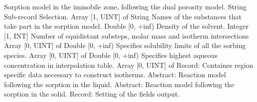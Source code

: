\begin{RecordType}
	{}
	{} %
	{} %
	{} %
	{{{Sorption model in the immobile zone, following the dual porosity model.}}}
		\KeyItem
			{}
			{{String}}
			{\textrangle}
			{} %
			{{{Sub-record Selection.}}}
		\KeyItem
			{}
			{{Array [1, UINT] of }{String}}
			{\textrangle}
			{} %
			{{{Names of the substances that take part in the sorption model.}}}
		\KeyItem
			{}
			{{Double [0, +inf)}}
			{\textrangle}
			{} %
			{{{Density of the solvent.}}}
		\KeyItem
			{}
			{{Integer [1, INT]}}
			{\textrangle}
			{} %
			{{{Number of equidistant substeps, molar mass and isotherm intersections}}}
		\KeyItem
			{}
			{{Array [0, UINT] of }{Double [0, +inf)}}
			{\textrangle}
			{} %
			{{{Specifies solubility limits of all the sorbing species.}}}
		\KeyItem
			{}
			{{Array [0, UINT] of }{Double [0, +inf)}}
			{\textrangle}
			{} %
			{{{Specifies highest aqueous concentration in interpolation table.}}}
		\KeyItem
			{}
			{{Array [0, UINT] of }{Record}{: }}
			{\textrangle}
			{} %
			{{{Containes region specific data necessary to construct isotherms.}}}
		\KeyItem
			{}
			{{Abstract}{: }}
			{\textrangle}
			{} %
			{{{Reaction model following the sorption in the liquid.}}}
		\KeyItem
			{}
			{{Abstract}{: }}
			{\textrangle}
			{} %
			{{{Reaction model following the sorption in the solid.}}}
		\KeyItem
			{}
			{{Record}{: }}
			{\textrangle}
			{} %
			{{{Setting of the fields output.}}}
\end{RecordType}
